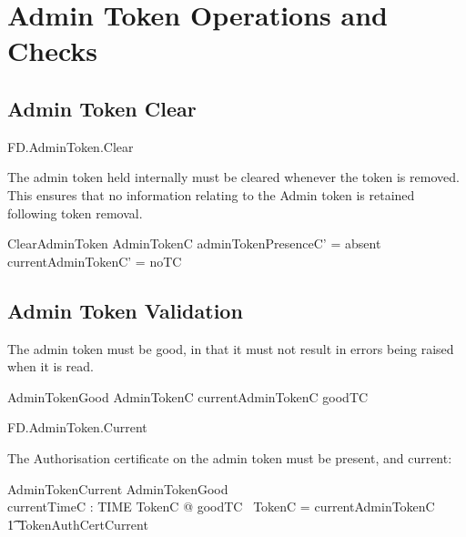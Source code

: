 \section{Admin Token Operations and Checks}

\subsection{Admin Token Clear}

\begin{traceunit}{FD.AdminToken.Clear}
\end{traceunit}

The admin token held internally must be cleared whenever the token is
removed. This ensures that no information relating to the Admin token
is retained following token removal.

\begin{schema}{ClearAdminToken}
        \Delta AdminTokenC
\where
        adminTokenPresenceC' = absent      
\\      currentAdminTokenC' = noTC
\end{schema}

\subsection{Admin Token Validation}

The admin token must be good, in that it must not result in errors being
raised when it is read.

\begin{schema}{AdminTokenGood}
        AdminTokenC
\where
 	currentAdminTokenC \in \ran goodTC
\end{schema}


\begin{traceunit}{FD.AdminToken.Current}
\end{traceunit}

The Authorisation certificate on the admin token must be present,
and current:

\begin{schema}{AdminTokenCurrent}
        AdminTokenGood
\\      currentTimeC : TIME
\where
        \exists TokenC @ goodTC~ \theta TokenC = currentAdminTokenC
\\ \t1          \land TokenAuthCertCurrent
\end{schema}

